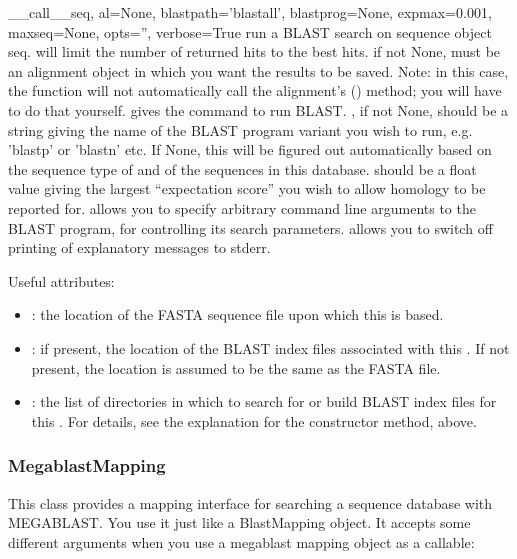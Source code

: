\documentclass{howto}
\begin{document}
\begin{funcdesc}{__call__}{seq, al=None, blastpath='blastall', blastprog=None, expmax=0.001,
maxseq=None, opts='', verbose=True}
  run a BLAST search on sequence object seq.
   will limit the number of returned hits to the best  hits. 
   if not None, must be an alignment object in which you want the results
  to be saved.  Note: in this case, the  function will not automatically
  call the alignment's () method; you will have to do that yourself.
   gives the command to run BLAST.
  , if not None, should be a string giving the name of the BLAST
  program variant you wish to run, e.g. 'blastp' or 'blastn' etc.  If None,
  this will be figured out automatically based on the sequence type of 
  and of the sequences in this database.
   should be a float value giving the largest ``expectation score''
  you wish to allow homology to be reported for.
   allows you to specify arbitrary command line arguments to the BLAST
  program, for controlling its search parameters.
   allows you to switch off printing of explanatory messages to 
  stderr.
\end{funcdesc}



Useful attributes:
\begin{itemize}

\item
{}: the location of the FASTA sequence file upon which
this  is based.

\item
{}: if present, the location of the BLAST index files
associated with this .  If not present, the location is assumed
to be the same as the FASTA file.

\item
{}: the list of directories in which to search for
or build BLAST index files for this .  For details, see
the explanation for the constructor method, above.

\end{itemize}


\subsubsection{MegablastMapping}
This class provides a mapping interface for searching a sequence
database with MEGABLAST.  You use it just like a BlastMapping object.
It accepts some different arguments when you use a megablast mapping
object as a callable:
\end{document}
